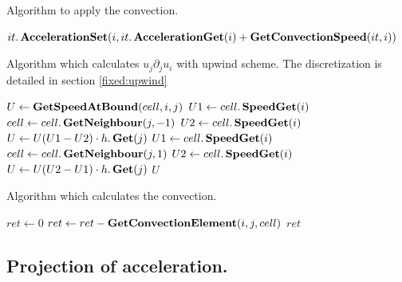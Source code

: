 \begin{algorithm}
\caption{Algorithm to apply the convection.}
\label{code:ApplyConvection}
\begin{algorithmic}[1]
					\State $it.\mathop{\textbf{AccelerationSet}}(i,it.\mathop{\textbf{AccelerationGet}}(i)+\mathop{\textbf{GetConvectionSpeed}}(it,i))$ 
				\EndIf
			\EndFor
		\EndFor
	\EndFunction
		\end{algorithmic}
\end{algorithm}

\begin{algorithm}
\caption{Algorithm which calculates $u_{j}\partial_{j}u_{i}$ with upwind scheme. The discretization is detailed in section \ref{fixed:upwind}}
\label{code:GetConvectionElement}
\begin{algorithmic}[1]
		\State $U \gets \mathop{\textbf{GetSpeedAtBound}}(cell,i,j)$
			\State $U1\gets cell.\mathop{\textbf{SpeedGet}}(i)$
			\State $cell \gets cell.\mathop{\textbf{GetNeighbour}}(j,-1)$
			\State $U2 \gets cell.\mathop{\textbf{SpeedGet}}(i)$
			\State $U \gets U(U1-U2)\cdot h.\mathop{\textbf{Get}}(j)$
		\Else
			\State $U1 \gets cell.\mathop{\textbf{SpeedGet}}(i)$
			\State $cell \gets cell.\mathop{\textbf{GetNeighbour}}(j,1)$
			\State $U2\gets cell.\mathop{\textbf{SpeedGet}}(i)$
			\State $U\gets U(U2-U1)\cdot h.\mathop{\textbf{Get}}(j)$
		\EndIf
		\State \Return $U$
\EndFunction
			\end{algorithmic}
\end{algorithm}

\begin{algorithm}
\caption{Algorithm which calculates the convection.}
\label{code:GetConvectionSpeed}
\begin{algorithmic}[1]
		\State  $ret \gets 0$
			\State $ret\gets ret-\mathop{\textbf{GetConvectionElement}}(i,j,cell)$
		\EndFor
		\State \Return $ret$
	\EndFunction
 \end{algorithmic}
\end{algorithm}


\subsection{Projection of acceleration.}

